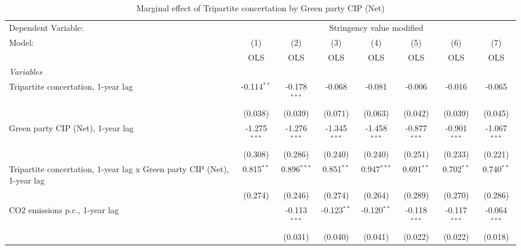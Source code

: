 
\begin{table}[htbp]
   \caption{Marginal effect of Tripartite concertation by Green party CIP (Net)}
   \centering
   \begin{tabular}{lccccccc}
      \toprule
      Dependent Variable: & \multicolumn{7}{c}{Stringency value modified}\\
      Model:                                                                  & (1)            & (2)            & (3)            & (4)            & (5)            & (6)            & (7)\\  
                                                                              &  OLS           & OLS            & OLS            & OLS            & OLS            & OLS            & OLS\\  
      \midrule
      \emph{Variables}\\
      Tripartite concertation, 1-year lag                                     & -0.114$^{**}$  & -0.178$^{***}$ & -0.068         & -0.081         & -0.006         & -0.016         & -0.065\\   
                                                                              & (0.038)        & (0.039)        & (0.071)        & (0.063)        & (0.042)        & (0.039)        & (0.045)\\   
      Green party CIP (Net), 1-year lag                                       & -1.275$^{***}$ & -1.276$^{***}$ & -1.345$^{***}$ & -1.458$^{***}$ & -0.877$^{***}$ & -0.901$^{***}$ & -1.067$^{***}$\\   
                                                                              & (0.308)        & (0.286)        & (0.240)        & (0.240)        & (0.251)        & (0.233)        & (0.221)\\   
      Tripartite concertation, 1-year lag x Green party CIP (Net), 1-year lag & 0.815$^{**}$   & 0.896$^{***}$  & 0.851$^{**}$   & 0.947$^{***}$  & 0.691$^{**}$   & 0.702$^{**}$   & 0.740$^{**}$\\   
                                                                              & (0.274)        & (0.246)        & (0.274)        & (0.264)        & (0.289)        & (0.270)        & (0.286)\\   
      CO2 emissions p.c., 1-year lag                                          &                & -0.113$^{***}$ & -0.123$^{**}$  & -0.120$^{**}$  & -0.118$^{***}$ & -0.117$^{***}$ & -0.064$^{***}$\\   
                                                                              &                & (0.031)        & (0.040)        & (0.041)        & (0.022)        & (0.022)        & (0.018)\\   

\end{tabular}
\end{table}
